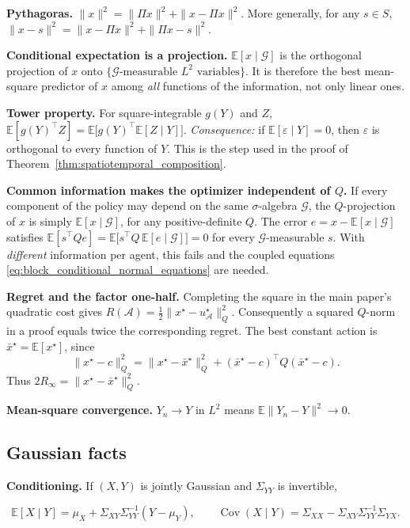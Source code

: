 \textbf{Pythagoras.} $\|x\|^2=\|\Pi x\|^2+\|x-\Pi x\|^2$. More generally, for any $s\in S$, $\|x-s\|^2=\|x-\Pi x\|^2+\|\Pi x-s\|^2$.

\textbf{Conditional expectation is a projection.} $\mathbb E[x\mid\mathcal G]$ is the orthogonal projection of $x$ onto $\{\mathcal G\text{-measurable }L^2\text{ variables}\}$. It is therefore the best mean-square predictor of $x$ among \emph{all} functions of the information, not only linear ones.

\textbf{Tower property.} For square-integrable $g(Y)$ and $Z$, $\mathbb E[g(Y)^\top Z]=\mathbb E\big[g(Y)^\top\mathbb E[Z\mid Y]\big]$. \emph{Consequence:} if $\mathbb E[\varepsilon\mid Y]=0$, then $\varepsilon$ is orthogonal to every function of $Y$. This is the step used in the proof of Theorem~\ref{thm:spatiotemporal_composition}.

\textbf{Common information makes the optimizer independent of $Q$.} If every component of the policy may depend on the same $\sigma$-algebra $\mathcal G$, the $Q$-projection of $x$ is simply $\mathbb E[x\mid\mathcal G]$, for any positive-definite $Q$. The error $e=x-\mathbb E[x\mid\mathcal G]$ satisfies $\mathbb E[s^\top Qe]=\mathbb E\big[s^\top Q\,\mathbb E[e\mid\mathcal G]\big]=0$ for every $\mathcal G$-measurable $s$. With \emph{different} information per agent, this fails and the coupled equations \eqref{eq:block_conditional_normal_equations} are needed.

\textbf{Regret and the factor one-half.} Completing the square in the main
paper's quadratic cost gives $R(\mathcal A)=\tfrac12\|x^\star-u^\star_{\mathcal A}\|_Q^2$.
Consequently a squared $Q$-norm in a proof equals twice the corresponding
regret. The best constant action is $\bar x^\star=\mathbb E[x^\star]$, since
\[
\|x^\star-c\|_Q^2=\|x^\star-\bar x^\star\|_Q^2+
(\bar x^\star-c)^\top Q(\bar x^\star-c).
\]
Thus $2R_\infty=\|x^\star-\bar x^\star\|_Q^2$.

\textbf{Mean-square convergence.} $Y_n\to Y$ in $L^2$ means $\mathbb E\|Y_n-Y\|^2\to0$.

\subsection{Gaussian facts}
\label{app:toolkit-3}
\textbf{Conditioning.} If $(X,Y)$ is jointly Gaussian and $\Sigma_{YY}$ is invertible,

\[
\mathbb E[X\mid Y]=\mu_X+\Sigma_{XY}\Sigma_{YY}^{-1}(Y-\mu_Y),\qquad \operatorname{Cov}(X\mid Y)=\Sigma_{XX}-\Sigma_{XY}\Sigma_{YY}^{-1}\Sigma_{YX}.
\]

